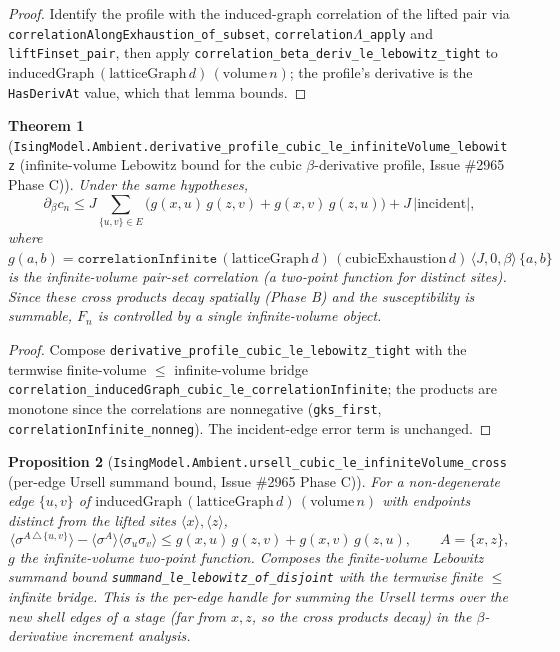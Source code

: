 \documentclass[a4paper,11pt]{article}
\newtheorem{theorem}{Theorem}
\newtheorem{proposition}[theorem]{Proposition}
\begin{document}
\begin{proof}
Identify the profile with the induced-graph correlation of the lifted pair via
\texttt{correlationAlongExhaustion\_of\_subset}, \texttt{correlation$\Lambda$\_apply}
and \texttt{liftFinset\_pair}, then apply
\texttt{correlation\_beta\_deriv\_le\_lebowitz\_tight} to
$\mathrm{inducedGraph}\,(\mathrm{latticeGraph}\,d)\,(\mathrm{volume}\,n)$; the
profile's derivative is the \texttt{HasDerivAt} value, which that lemma bounds.
\end{proof}

\begin{theorem}[\texttt{IsingModel.Ambient.derivative\_profile\_cubic\_le\_infiniteVolume\_lebowitz}
(infinite-volume Lebowitz bound for the cubic $\beta$-derivative profile, Issue \#2965 Phase C)]
Under the same hypotheses,
\[
  \partial_\beta c_n \le J\sum_{\{u,v\}\in E}
    \bigl(g(x,u)\,g(z,v)+g(x,v)\,g(z,u)\bigr) + J\,|\mathrm{incident}|,
\]
where $g(a,b)=\texttt{correlationInfinite}\,(\mathrm{latticeGraph}\,d)\,
(\mathrm{cubicExhaustion}\,d)\,\langle J,0,\beta\rangle\,\{a,b\}$ is the
infinite-volume pair-set correlation (a two-point function for distinct sites).
Since these cross products decay spatially
(Phase B) and the susceptibility is summable, $F_n$ is controlled by a single
infinite-volume object.
\end{theorem}

\begin{proof}
Compose \texttt{derivative\_profile\_cubic\_le\_lebowitz\_tight} with the termwise
finite-volume $\le$ infinite-volume bridge
\texttt{correlation\_inducedGraph\_cubic\_le\_correlationInfinite}; the products are
monotone since the correlations are nonnegative (\texttt{gks\_first},
\texttt{correlationInfinite\_nonneg}). The incident-edge error term is unchanged.
\end{proof}

\begin{proposition}[\texttt{IsingModel.Ambient.ursell\_cubic\_le\_infiniteVolume\_cross}
(per-edge Ursell summand bound, Issue \#2965 Phase C)]
For a non-degenerate edge $\{u,v\}$ of $\mathrm{inducedGraph}\,(\mathrm{latticeGraph}\,d)\,
(\mathrm{volume}\,n)$ with endpoints distinct from the lifted sites
$\langle x\rangle,\langle z\rangle$,
\[
  \langle\sigma^{A\,\triangle\,\{u,v\}}\rangle-\langle\sigma^A\rangle\langle\sigma_u\sigma_v\rangle
    \le g(x,u)\,g(z,v)+g(x,v)\,g(z,u),\qquad A=\{x,z\},
\]
$g$ the infinite-volume two-point function. Composes the finite-volume Lebowitz
summand bound \texttt{summand\_le\_lebowitz\_of\_disjoint} with the termwise
finite $\le$ infinite bridge. This is the per-edge handle for summing the Ursell
terms over the new shell edges of a stage (far from $x,z$, so the cross products
decay) in the $\beta$-derivative increment analysis.
\end{proposition}
\end{document}
